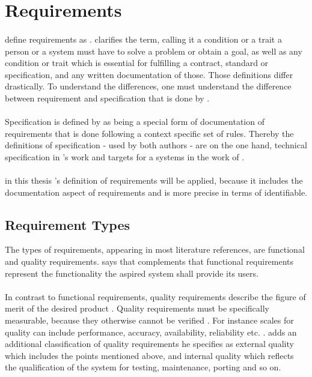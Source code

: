 \section{Requirements}
\paragraph{} \textcite[4]{Sommerville.2000} define requirements as . \textcite[13]{Pohl.2007} clarifies the term, calling it a condition or a trait a person or a system must have to solve a problem or obtain a goal, as well as any condition or trait which is essential for fulfilling a contract, standard or specification, and any written documentation of those. Those definitions differ drastically. To understand the differences, one must understand the difference between requirement and specification that is done by \citeauthor{Pohl.2007}.
\paragraph{} Specification is defined by \textcite[220]{Pohl.2007} as being a special form of documentation of requirements that is done following a context specific set of rules. Thereby the definitions of specification - used by both authors - are on the one hand, technical specification in \citeauthor{Pohl.2007}'s work and targets for a systems in the work of \citeauthor{Sommerville.2000}. 
\paragraph{} in this thesis \citeauthor{Pohl.2007}'s definition of requirements will be applied, because it includes the documentation aspect of requirements and is more precise in terms of identifiable.
\subsection{Requirement Types}
The types of requirements, appearing in most literature references, are functional and quality requirements. \textcite[14]{Lauesen.2008} says that  \textcite[cf.][15]{Pohl.2007} complements that functional requirements represent the functionality the aspired system shall provide its users. 
\paragraph{} In contrast to functional requirements, quality requirements describe the figure of merit of the desired product \parencite[cf.][15]{Lauesen.2008}. Quality requirements must be specifically measurable, because they otherwise cannot be verified \parencite[cf.][371-371]{Lauesen.2008}. For instance scales for quality can include performance, accuracy, availability, reliability etc. \parencite[cf.][15]{Pohl.2007}. \textcite[cf.][29]{Ebert.2014} adds an additional classification of quality requirements he specifies as external quality which includes the points mentioned above, and internal quality which reflects the qualification of the system for testing, maintenance, porting and so on. 
